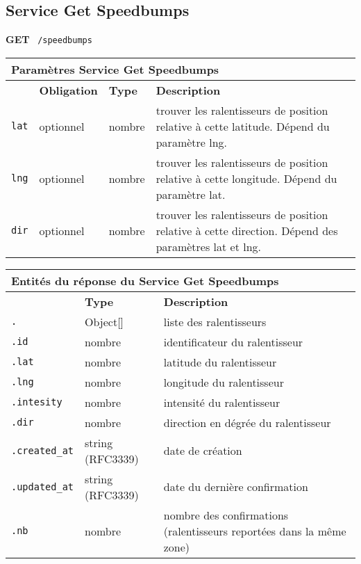 \subsection{Service Get Speedbumps}
\label{appendix:sprint3-speedbumps-get-doc}

\textbf{GET} \ \texttt{/speedbumps}

\begin{table}[H]
    \centering
    \begin{tabularx}{\textwidth}{@{}p{2cm} p{2cm} p{3.5cm} p{6cm}@{}}
        \multicolumn{4}{X}{\textbf{Paramètres Service Get Speedbumps}} \\
        \toprule
        \rowcolor{gray!20}
        \multicolumn{1}{l}{\textbf{Élément}} &
        \multicolumn{1}{l}{\textbf{Obligation}} &
        \multicolumn{1}{l}{\textbf{Type}} &
        \multicolumn{1}{l}{\textbf{Description}} \\
        \midrule
        \verb|lat| & optionnel & nombre & trouver les ralentisseurs de position relative à cette latitude. Dépend du paramètre lng. \\
        \verb|lng| & optionnel & nombre & trouver les ralentisseurs de position relative à cette longitude. Dépend du paramètre lat. \\
        \verb|dir| & optionnel & nombre & trouver les ralentisseurs de position relative à cette direction. Dépend des paramètres lat et lng. \\
        \bottomrule
    \end{tabularx}
\end{table}

\begin{table}[H]
    \centering
    \begin{tabularx}{\textwidth}{@{}p{3cm} p{3.5cm} p{7.5cm}@{}}
        \multicolumn{3}{X}{\textbf{Entités du réponse du Service Get Speedbumps}} \\
        \toprule
        \rowcolor{gray!20}
        \multicolumn{1}{l}{\textbf{Élément}} &
        \multicolumn{1}{l}{\textbf{Type}} &
        \multicolumn{1}{l}{\textbf{Description}} \\
        \midrule
        \verb|.| & Object[] & liste des ralentisseurs \\
        \verb|.id| & nombre & identificateur du ralentisseur \\
        \verb|.lat| & nombre & latitude du ralentisseur \\
        \verb|.lng| & nombre & longitude du ralentisseur \\
        \verb|.intesity| & nombre & intensité du ralentisseur \\
        \verb|.dir| & nombre & direction en dégrée du ralentisseur \\
        \verb|.created_at| & string (RFC3339) & date de création \\
        \verb|.updated_at| & string (RFC3339) & date du dernière confirmation\\
        \verb|.nb| & nombre & nombre des confirmations (ralentisseurs reportées dans la même zone)\\
        \bottomrule
    \end{tabularx}
\end{table}
